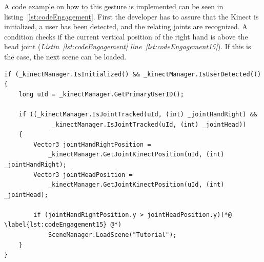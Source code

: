 A code example on how to this gesture is implemented can be seen in listing~\ref{lst:codeEngagement}.
First the developer has to assure that the Kinect is initialized, a user has been detected, and the relating joints are recognized.  A condition checks if the current vertical position of the right hand is above the head joint (\textit{Listin~\ref{lst:codeEngagement} line~\ref{lst:codeEngagement15}}). If this is the case, the next scene can be loaded. 

\begin{lstlisting}[caption=C$^\sharp$ example code for tracking a raising hand, label=lst:codeEngagement]
if (_kinectManager.IsInitialized() && _kinectManager.IsUserDetected())
{
	long uId = _kinectManager.GetPrimaryUserID();

	if ((_kinectManager.IsJointTracked(uId, (int) _jointHandRight) && 
			 _kinectManager.IsJointTracked(uId, (int) _jointHead))
	{
		Vector3 jointHandRightPosition = 
			_kinectManager.GetJointKinectPosition(uId, (int) _jointHandRight);
		Vector3 jointHeadPosition = 
			_kinectManager.GetJointKinectPosition(uId, (int) _jointHead);			

		if (jointHandRightPosition.y > jointHeadPosition.y)(*@ \label{lst:codeEngagement15} @*)
			SceneManager.LoadScene("Tutorial");
	}
}
\end{lstlisting}

